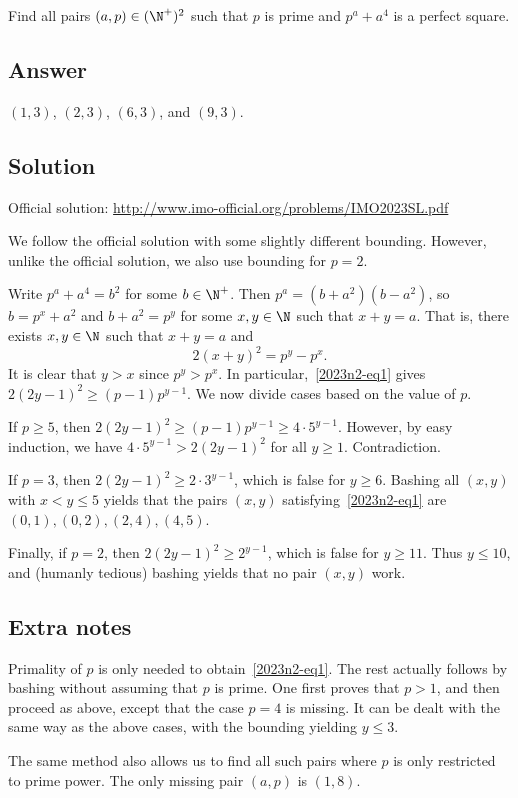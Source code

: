 Find all pairs $(a, p) \in (\N^+)^2$ such that $p$ is prime and $p^a + a^4$ is a perfect square.



\subsection*{Answer}

$(1, 3)$, $(2, 3)$, $(6, 3)$, and $(9, 3)$.



\subsection*{Solution}

Official solution: \url{http://www.imo-official.org/problems/IMO2023SL.pdf}

We follow the official solution with some slightly different bounding.
However, unlike the official solution, we also use bounding for $p = 2$.

Write $p^a + a^4 = b^2$ for some $b \in \N^+$.
Then $p^a = (b + a^2)(b - a^2)$, so $b = p^x + a^2$ and $b + a^2 = p^y$ for some $x, y \in \N$ such that $x + y = a$.
That is, there exists $x, y \in \N$ such that $x + y = a$ and
\[ 2(x + y)^2 = p^y - p^x. \tag{1}\label{2023n2-eq1} \]
It is clear that $y > x$ since $p^y > p^x$.
In particular,~\eqref{2023n2-eq1} gives $2(2y - 1)^2 \geq (p - 1) p^{y - 1}$.
We now divide cases based on the value of $p$.

If $p \geq 5$, then $2(2y - 1)^2 \geq (p - 1) p^{y - 1} \geq 4 \cdot 5^{y - 1}$.
However, by easy induction, we have $4 \cdot 5^{y - 1} > 2(2y - 1)^2$ for all $y \geq 1$.
Contradiction.

If $p = 3$, then $2(2y - 1)^2 \geq 2 \cdot 3^{y - 1}$, which is false for $y \geq 6$.
Bashing all $(x, y)$ with $x < y \leq 5$ yields that the pairs $(x, y)$ satisfying~\eqref{2023n2-eq1} are $(0, 1), (0, 2), (2, 4), (4, 5)$.

Finally, if $p = 2$, then $2(2y - 1)^2 \geq 2^{y - 1}$, which is false for $y \geq 11$.
Thus $y \leq 10$, and (humanly tedious) bashing yields that no pair $(x, y)$ work.



\subsection*{Extra notes}

Primality of $p$ is only needed to obtain~\eqref{2023n2-eq1}.
The rest actually follows by bashing without assuming that $p$ is prime.
One first proves that $p > 1$, and then proceed as above, except that the case $p = 4$ is missing.
It can be dealt with the same way as the above cases, with the bounding yielding $y \leq 3$.

The same method also allows us to find all such pairs where $p$ is only restricted to prime power.
The only missing pair $(a, p)$ is $(1, 8)$.
